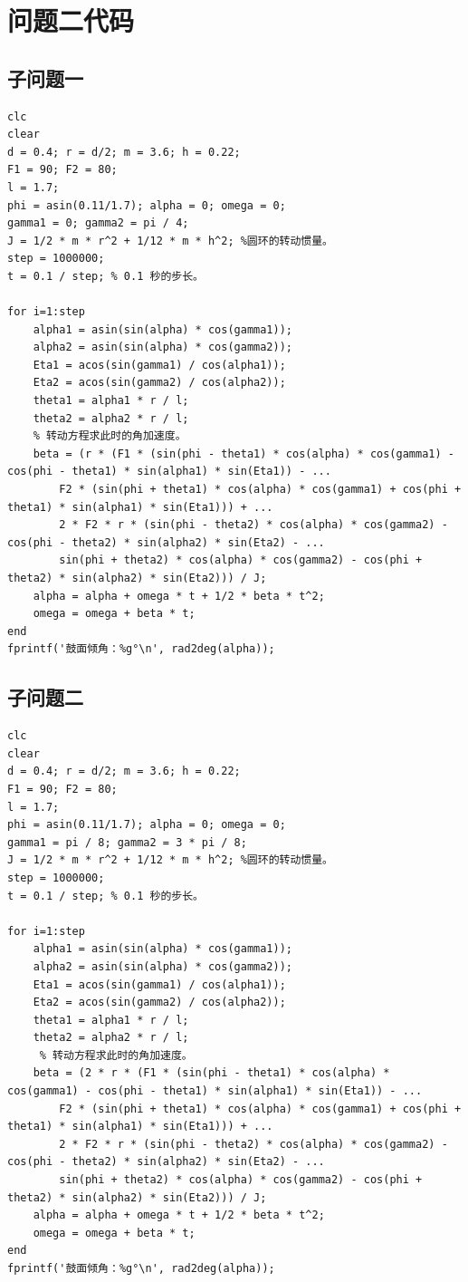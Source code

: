\documentclass{cumcm}
\begin{document}
\section{问题二代码}
\subsection{子问题一}
\begin{lstlisting}
clc
clear
d = 0.4; r = d/2; m = 3.6; h = 0.22;
F1 = 90; F2 = 80;
l = 1.7;
phi = asin(0.11/1.7); alpha = 0; omega = 0;
gamma1 = 0; gamma2 = pi / 4;
J = 1/2 * m * r^2 + 1/12 * m * h^2; %圆环的转动惯量。
step = 1000000;
t = 0.1 / step; % 0.1 秒的步长。

for i=1:step
    alpha1 = asin(sin(alpha) * cos(gamma1));
    alpha2 = asin(sin(alpha) * cos(gamma2));
    Eta1 = acos(sin(gamma1) / cos(alpha1));
    Eta2 = acos(sin(gamma2) / cos(alpha2));
    theta1 = alpha1 * r / l;
    theta2 = alpha2 * r / l;
    % 转动方程求此时的角加速度。
    beta = (r * (F1 * (sin(phi - theta1) * cos(alpha) * cos(gamma1) - cos(phi - theta1) * sin(alpha1) * sin(Eta1)) - ...
        F2 * (sin(phi + theta1) * cos(alpha) * cos(gamma1) + cos(phi + theta1) * sin(alpha1) * sin(Eta1))) + ...
        2 * F2 * r * (sin(phi - theta2) * cos(alpha) * cos(gamma2) - cos(phi - theta2) * sin(alpha2) * sin(Eta2) - ...
        sin(phi + theta2) * cos(alpha) * cos(gamma2) - cos(phi + theta2) * sin(alpha2) * sin(Eta2))) / J;
    alpha = alpha + omega * t + 1/2 * beta * t^2;
    omega = omega + beta * t;
end
fprintf('鼓面倾角：%g°\n', rad2deg(alpha));
\end{lstlisting}

\subsection{子问题二}
\begin{lstlisting}
clc
clear
d = 0.4; r = d/2; m = 3.6; h = 0.22;
F1 = 90; F2 = 80;
l = 1.7;
phi = asin(0.11/1.7); alpha = 0; omega = 0;
gamma1 = pi / 8; gamma2 = 3 * pi / 8;
J = 1/2 * m * r^2 + 1/12 * m * h^2; %圆环的转动惯量。
step = 1000000;
t = 0.1 / step; % 0.1 秒的步长。

for i=1:step
    alpha1 = asin(sin(alpha) * cos(gamma1));
    alpha2 = asin(sin(alpha) * cos(gamma2));
    Eta1 = acos(sin(gamma1) / cos(alpha1));
    Eta2 = acos(sin(gamma2) / cos(alpha2));
    theta1 = alpha1 * r / l;
    theta2 = alpha2 * r / l;
     % 转动方程求此时的角加速度。
    beta = (2 * r * (F1 * (sin(phi - theta1) * cos(alpha) * cos(gamma1) - cos(phi - theta1) * sin(alpha1) * sin(Eta1)) - ...
        F2 * (sin(phi + theta1) * cos(alpha) * cos(gamma1) + cos(phi + theta1) * sin(alpha1) * sin(Eta1))) + ...
        2 * F2 * r * (sin(phi - theta2) * cos(alpha) * cos(gamma2) - cos(phi - theta2) * sin(alpha2) * sin(Eta2) - ...
        sin(phi + theta2) * cos(alpha) * cos(gamma2) - cos(phi + theta2) * sin(alpha2) * sin(Eta2))) / J;
    alpha = alpha + omega * t + 1/2 * beta * t^2;
    omega = omega + beta * t;
end
fprintf('鼓面倾角：%g°\n', rad2deg(alpha));
\end{lstlisting}
\end{document}
